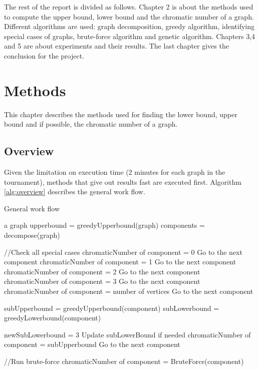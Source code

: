 \documentclass[a4paper]{report}
\begin{document}
	The rest of the report is divided as follows. Chapter 2 is about the methods used to compute the upper bound, lower bound and the chromatic number of a graph. Different algorithms are used: graph decomposition, greedy algorithm, identifying special cases of graphs, brute-force algorithm and genetic algorithm. Chapters 3,4 and 5 are about experiments and their results. The last chapter gives the conclusion for the project.
	
	\chapter{Methods}
	This chapter describes the methods used for finding the lower bound, upper bound and if possible, the chromatic number of a graph. 
	\section{Overview}
	Given the limitation on execution time (2 minutes for each graph in the tournament), methods that give out results fast are executed first. Algorithm \ref{alg:overview} describes the general work flow.\\
	\begin{algorithm}
		\caption{General work flow}
		\label{alg:overview}
		\begin{algorithmic}[1]
			\REQUIRE a graph
			\STATE upperbound = greedyUpperbound(graph)
			\STATE components = decompose(graph)
				
				\STATE//Check all special cases
					\STATE chromaticNumber of component = 0
					\STATE Go to the next component
				\ENDIF
				\STATE chromaticNumber of component = 1
				\STATE Go to the next component
				\ENDIF
				\STATE chromaticNumber of component = 2
				\STATE Go to the next component
				\ENDIF
				\STATE chromaticNumber of component = 3
				\STATE Go to the next component
				\ENDIF
				\STATE chromaticNumber of component = number of vertices
				\STATE Go to the next component
				\ENDIF
				
				\STATE subUpperbound =  greedyUpperbound(component)
				\STATE subLowerbound =  greedyLowerbound(component)
				
				\STATE newSubLowerbound = 3
				\STATE Update subLowerBound if needed
				\STATE chromaticNumber of component = subUpperbound
				\STATE Go to the next component
				\ENDIF
				
				\STATE//Run brute-force
				\STATE chromaticNumber of component = BruteForce(component)
				\ENDIF 
			\ENDFOR

			\end{algorithmic}
		\end{algorithm}
\end{document}
